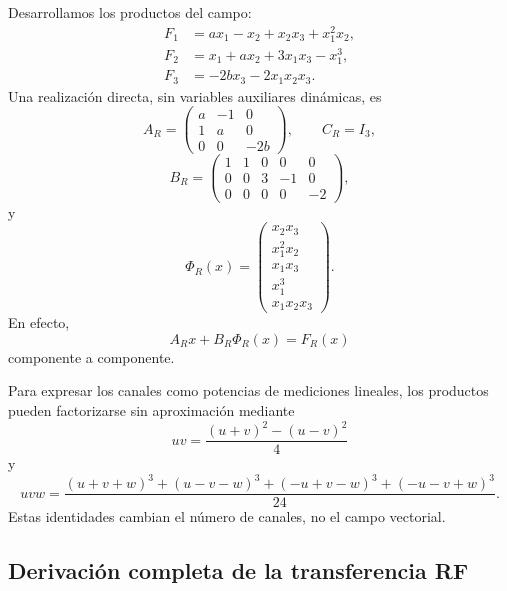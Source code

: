 Desarrollamos los productos del campo:
\begin{align*}
 F_1&=a x_1-x_2+x_2x_3+x_1^2x_2,\\
 F_2&=x_1+a x_2+3x_1x_3-x_1^3,\\
 F_3&=-2b x_3-2x_1x_2x_3.
\end{align*}
Una realización directa, sin variables auxiliares dinámicas, es
\begin{equation}
 A_R=
 \begin{pmatrix}
 a&-1&0\\1&a&0\\0&0&-2b
 \end{pmatrix},\qquad C_R=I_3,
 \label{nc:eq:rf-a}
\end{equation}
\begin{equation}
 B_R=
 \begin{pmatrix}
 1&1&0&0&0\\
 0&0&3&-1&0\\
 0&0&0&0&-2
 \end{pmatrix},
 \label{nc:eq:rf-b}
\end{equation}
y
\begin{equation}
 \Phi_R(x)=
 \begin{pmatrix}
 x_2x_3\\x_1^2x_2\\x_1x_3\\x_1^3\\x_1x_2x_3
 \end{pmatrix}.
 \label{nc:eq:rf-phi}
\end{equation}
En efecto,
\begin{equation}
 A_Rx+B_R\Phi_R(x)=F_R(x)
\end{equation}
componente a componente.

Para expresar los canales como potencias de mediciones lineales, los productos
pueden factorizarse sin aproximación mediante
\begin{equation}
 uv=\frac{(u+v)^2-(u-v)^2}{4}
 \label{nc:eq:square-identity}
\end{equation}
y
\begin{equation}
 uvw=\frac{(u+v+w)^3+(u-v-w)^3+(-u+v-w)^3+(-u-v+w)^3}{24}.
 \label{nc:eq:cubic-identity}
\end{equation}
Estas identidades cambian el número de canales, no el campo vectorial.

\subsection{Derivación completa de la transferencia RF}

